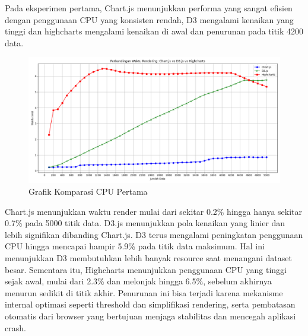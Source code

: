 Pada eksperimen pertama, Chart.js menunjukkan performa yang sangat efisien
dengan penggunaan CPU yang konsisten rendah, D3 mengalami kenaikan
yang tinggi dan highcharts mengalami kenaikan di awal dan penurunan pada
titik 4200 data.
	\begin{figure}[H]
	\centering
	\includegraphics[width=0.8\linewidth]{gambar/Pembahasan/FIX_CPU/Figure_1.png}
	\caption{Grafik Komparasi CPU Pertama}
	\label{Grafik Komparasi CPU Pertama}
\end{figure}
Chart.js menunjukkan waktu render mulai dari sekitar 0.2\% hingga hanya sekitar 0.7\% pada 5000 titik data. D3.js menunjukkan pola kenaikan yang linier dan lebih signifikan dibanding Chart.js. D3 terus mengalami peningkatan penggunaan CPU hingga mencapai hampir 5.9\% pada titik data maksimum. Hal ini menunjukkan D3 membutuhkan lebih banyak resource saat menangani dataset besar. Sementara itu, Highcharts menunjukkan penggunaan CPU yang tinggi sejak awal, mulai dari 2.3\% dan melonjak hingga 6.5\%, sebelum akhirnya menurun sedikit di titik akhir. Penurunan ini bisa terjadi karena mekanisme internal optimasi seperti threshold dan simplifikasi rendering, serta pembatasan otomatis dari browser yang bertujuan menjaga stabilitas dan mencegah aplikasi crash.

